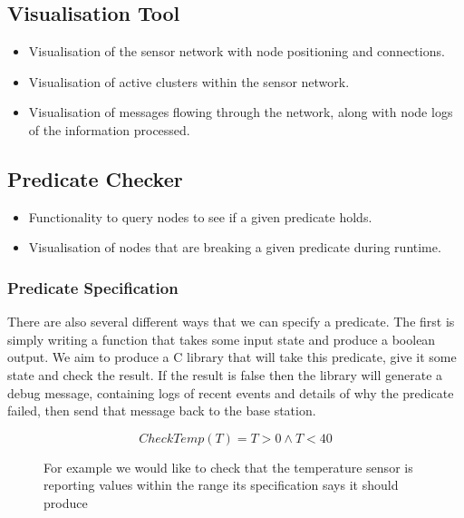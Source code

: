 \documentclass[a4paper]{article}
\begin{document}
\subsection{Visualisation Tool}
\begin{itemize}
	\item Visualisation of the sensor network with node positioning and
connections.
	\item Visualisation of active clusters within the sensor network.
	\item Visualisation of messages flowing through the network, along with
node logs of the information processed.
\end{itemize}

\subsection{Predicate Checker}
\begin{itemize}
	\item Functionality to query nodes to see if a given predicate holds.
	\item Visualisation of nodes that are breaking a given predicate during
runtime.
\end{itemize}

\subsubsection{Predicate Specification}

There are also several different ways that we can specify a predicate. The first
is simply writing a function that takes some input state and produce a boolean
output. We aim to produce a C library that will take this predicate, give it
some state and check the result. If the result is false then the library will
generate a debug message, containing logs of recent events and details of why
the predicate failed, then send that message back to the base station.

\begin{figure}[H]
\begin{center}
    \begin{displaymath}
	CheckTemp(T) = T > 0 \land T < 40
	\end{displaymath}
	\caption{For example we would like to check that the temperature sensor
is reporting values within the range its specification says it should produce}
\end{center}
\end{figure}
\end{document}
